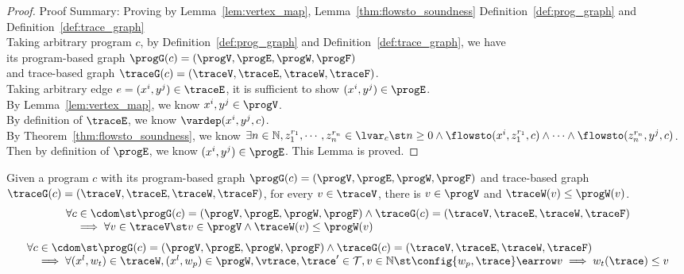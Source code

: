 \begin{proof}
Proof Summary: Proving by Lemma~\ref{lem:vertex_map}, Lemma~\ref{thm:flowsto_soundness} Definition~\ref{def:prog_graph} and Definition~\ref{def:trace_graph}
\\
Taking arbitrary program $c$,
by Definition~\ref{def:prog_graph} and Definition~\ref{def:trace_graph}, 
we have   
\\
its program-based graph $\progG({c}) = (\progV, \progE, \progW, \progF)$ 
\\
and 
trace-based graph $\traceG({c}) = (\traceV, \traceE, \traceW, \traceF)$.
\\
Taking arbitrary edge $e = (x^i, y^j) \in \traceE$, it is sufficient to show $(x^i, y^j) \in \progE$.
\\
By Lemma~\ref{lem:vertex_map}, we know $x^i, y^j \in \progV$.
\\
By definition of $\traceE$, we know $\vardep(x^i, y^j, c)$.
\\
By Theorem~\ref{thm:flowsto_soundness}, we know $ \exists n \in \mathbb{N}, z_1^{r_1}, \cdots, z_n^{r_n} \in \lvar_{{c}} \st 
n \geq 0 \land
\flowsto(x^i,  z_1^{r_1}, c) 
\land \cdots \land \flowsto(z_n^{r_n}, y^j, c) $.
\\
Then by definition of $\progE$, we know $(x^i, y^j) \in \progE$. This Lemma is proved.
\end{proof}
%
\begin{lem}
	\label{lem:weights_map}
	Given a program $c$ with its
	program-based graph $\progG({c}) = (\progV, \progE, \progW, \progF)$
	and 
	trace-based graph $\traceG({c}) = (\traceV, \traceE, \traceW, \traceF)$,
	for every $v \in \traceV$, there is $v \in \progV$ and $\traceW(v) \leq \progW(v)$.
\[
	\begin{array}{l}
	\forall c \in \cdom 
	 \st 
	 \progG({c}) = (\progV, \progE, \progW, \progF)
	\land 
	\traceG({c}) = (\traceV, \traceE, \traceW, \traceF)
	\\ \quad
	\implies
	\forall v \in \traceV \st 
	v \in \progV \land
	\traceW(v) \leq \progW(v)
	\end{array}
	\]
	\[
		\begin{array}{l}
			\forall c \in \cdom 
			 \st 
			 \progG({c}) = (\progV, \progE, \progW, \progF)
			\land 
			\traceG({c}) = (\traceV, \traceE, \traceW, \traceF)
			\\ \quad
			\implies
			\forall (x^l, w_{t}) \in \traceW,
			(x^l, w_{p}) \in \progW, \vtrace, \trace' \in \mathcal{T}, v \in \mathbb{N} \st
			\config{w_{p}, \trace} \earrow v
			\implies
			w_{t}(\trace) \leq v
		\end{array}
		\]
	\end{lem}
